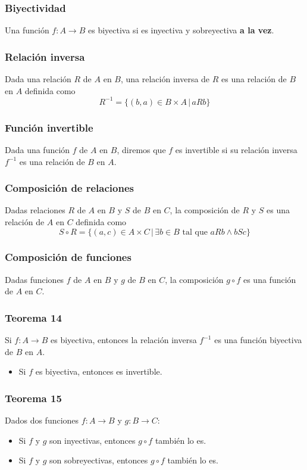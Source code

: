 \begin{multicols}{2}
    \subsubsection*{Biyectividad}
    Una función $f:A \rightarrow B$ es biyectiva si es inyectiva y sobreyectiva \textbf{a la vez}.
    
    \subsubsection*{Relación inversa}
    Dada una relación $R$ de $A$ en $B$, una relación inversa de $R$ es una relación de $B$ en $A$ definida como
    $$
    R^{-1} = \{ (b,a) \in B \times A \,|\, aRb \}
    $$
    
    \subsubsection*{Función invertible}
    Dada una función $f$ de $A$ en $B$, diremos que $f$ es invertible si su relación inversa $f^{-1}$ es una relación de $B$ en $A$.
    
    \subsubsection*{Composición de relaciones}
    Dadas relaciones $R$ de $A$ en $B$ y $S$ de $B$ en $C$, la composición de $R$ y $S$ es una relación de $A$ en $C$ definida como
    $$
    S \circ R = \{ (a,c) \in A \times C \,|\, \exists b \in B \text{ tal que } aRb \wedge bSc \}
    $$
    
    \subsubsection*{Composición de funciones}
    Dadas funciones $f$ de $A$ en $B$ y $g$ de $B$ en $C$, la composición $g \circ f$ es una función de $A$ en $C$.
    
    \subsubsection*{Teorema 14}
    Si $f: A \rightarrow B$ es biyectiva, entonces la relación inversa $f^{-1}$ es una función biyectiva de $B$ en $A$.
    \begin{itemize}
        \item Si $f$ es biyectiva, entonces es invertible.
    \end{itemize}
    
    \subsubsection*{Teorema 15}
    Dados dos funciones $f: A \rightarrow B$ y $g: B \rightarrow C$:
    \begin{itemize}
        \item Si $f$ y $g$ son inyectivas, entonces $g \circ f$ también lo es.
        \item Si $f$ y $g$ son sobreyectivas, entonces $g \circ f$ también lo es.
    \end{itemize}
    

\end{multicols}
